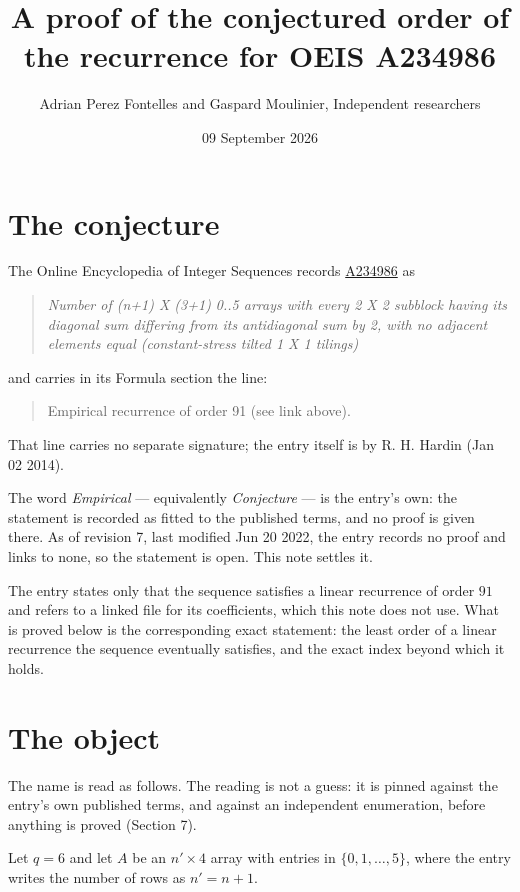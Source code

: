 \documentclass[11pt]{article}
\title{A proof of the conjectured order of the recurrence for OEIS A234986}
\author{Adrian Perez Fontelles and Gaspard Moulinier, Independent researchers}
\date{09 September 2026}
\theoremstyle{definition}
\begin{document}
\maketitle
\section{The conjecture}

The Online Encyclopedia of Integer Sequences records \href{https://oeis.org/A234986}{A234986} as

\begin{quote}\itshape Number of (n+1) X (3+1) 0..5 arrays with every 2 X 2 subblock having its diagonal sum differing from its antidiagonal sum by 2, with no adjacent elements equal (constant-stress tilted 1 X 1 tilings)\end{quote}

and carries in its Formula section the line:

\begin{quote}\ttfamily Empirical recurrence of order 91 (see link above).\end{quote}

That line carries no separate signature; the entry itself is by R. H. Hardin (Jan 02 2014).

The word {\itshape Empirical} --- equivalently {\itshape Conjecture} --- is the entry's own: the statement is recorded as fitted to the published terms, and no proof is given there. As of revision 7, last modified Jun 20 2022, the entry records no proof and links to none, so the statement is open. This note settles it.

The entry states only that the sequence satisfies a linear recurrence of order $91$ and refers to a linked file for its coefficients, which this note does not use. What is proved below is the corresponding exact statement: the least order of a linear recurrence the sequence eventually satisfies, and the exact index beyond which it holds.

\section{The object}

The name is read as follows. The reading is not a guess: it is pinned against the entry's own published terms, and against an independent enumeration, before anything is proved (Section 7).

Let $q = 6$ and let $A$ be an $n' \times 4$ array with entries in $\{0,1,\dots,5\}$, where the entry writes the number of rows as $n' = n + 1$.
\end{document}
